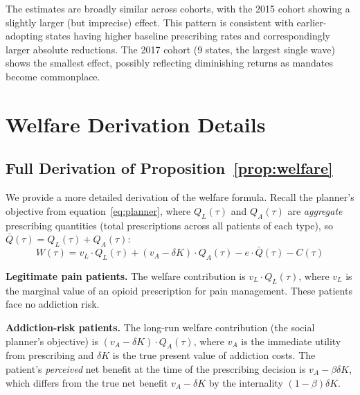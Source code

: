 \documentclass[12pt]{article}
\begin{document}
The estimates are broadly similar across cohorts, with the 2015 cohort showing a slightly larger (but imprecise) effect. This pattern is consistent with earlier-adopting states having higher baseline prescribing rates and correspondingly larger absolute reductions. The 2017 cohort (9 states, the largest single wave) shows the smallest effect, possibly reflecting diminishing returns as mandates become commonplace.


\section{Welfare Derivation Details}\label{app:welfare}

\subsection{Full Derivation of Proposition~\ref{prop:welfare}}

We provide a more detailed derivation of the welfare formula. Recall the planner's objective from equation~\eqref{eq:planner}, where $Q_L(\tau)$ and $Q_A(\tau)$ are \textit{aggregate} prescribing quantities (total prescriptions across all patients of each type), so $\bar{Q}(\tau) = Q_L(\tau) + Q_A(\tau)$:
\begin{equation}
W(\tau) = v_L \cdot Q_L(\tau) + (v_A - \delta K) \cdot Q_A(\tau) - e \cdot \bar{Q}(\tau) - C(\tau)
\end{equation}

\textbf{Legitimate pain patients.} The welfare contribution is $v_L \cdot Q_L(\tau)$, where $v_L$ is the marginal value of an opioid prescription for pain management. These patients face no addiction risk.

\textbf{Addiction-risk patients.} The long-run welfare contribution (the social planner's objective) is $(v_A - \delta K) \cdot Q_A(\tau)$, where $v_A$ is the immediate utility from prescribing and $\delta K$ is the true present value of addiction costs. The patient's \textit{perceived} net benefit at the time of the prescribing decision is $v_A - \beta \delta K$, which differs from the true net benefit $v_A - \delta K$ by the internality $(1 - \beta)\delta K$.
\end{document}
